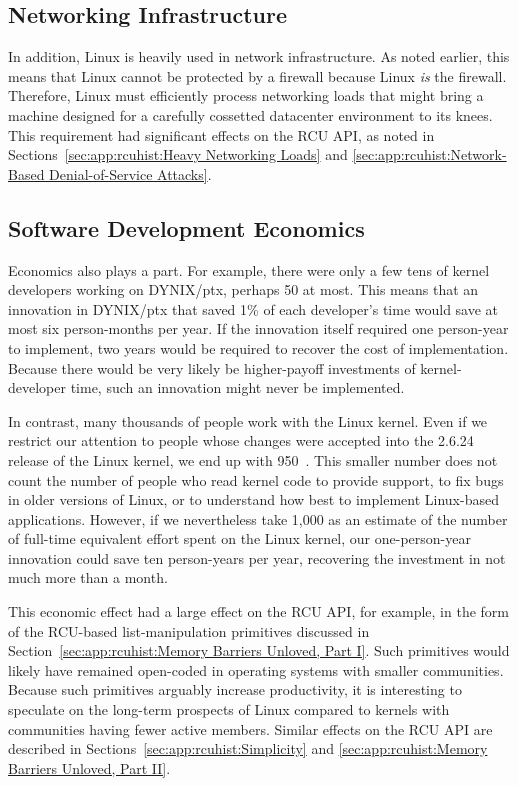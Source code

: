 \subsection{Networking Infrastructure}
\label{sec:app:rcuhist:Networking Infrastructure}

In addition, Linux is heavily used in network infrastructure.
As noted earlier, this means that Linux cannot be protected
by a firewall because Linux \emph{is} the firewall.
Therefore, Linux must efficiently process networking loads that
might bring a machine designed for a carefully cossetted
datacenter environment to its knees.
This requirement had significant effects on the RCU API, as
noted in Sections~\ref{sec:app:rcuhist:Heavy Networking Loads} and
\ref{sec:app:rcuhist:Network-Based Denial-of-Service Attacks}.

\subsection{Software Development Economics}
\label{sec:app:rcuhist:Software Development Economics}

Economics also plays a part.
For example, there were only a few tens of kernel developers working
on DYNIX/ptx, perhaps 50 at most.
This means that an innovation in DYNIX/ptx that saved 1\% of each
developer's time would save at most six person-months per year.
If the innovation itself required one person-year to implement,
two years would be required to recover the cost of implementation.
Because there would be very likely be higher-payoff investments
of kernel-developer time, such an innovation might never be
implemented.

In contrast, many thousands of people work with the Linux kernel.
Even if we restrict our attention to people whose changes were
accepted into the 2.6.24 release of the Linux kernel, we end up
with 950~\cite{Corbet2008stats2:6:24}.
This smaller number does not count the number of people who read
kernel code to provide support, to fix bugs in older versions of
Linux, or to understand how best to implement Linux-based applications.
However, if we nevertheless take 1,000 as an estimate of the
number of full-time equivalent effort spent on the Linux kernel,
our one-person-year innovation could save ten person-years per
year, recovering the investment in not much more than a month.

This economic effect had a large effect on the
RCU API, for example, in the form of the RCU-based list-manipulation
primitives discussed in
Section~\ref{sec:app:rcuhist:Memory Barriers Unloved, Part I}.
Such primitives would likely have remained open-coded in operating
systems with smaller communities.
Because such primitives arguably increase productivity, it is
interesting to speculate on the long-term prospects of Linux
compared to kernels with communities having fewer active members.
Similar effects on the RCU API are described in
Sections~\ref{sec:app:rcuhist:Simplicity} and \ref{sec:app:rcuhist:Memory Barriers Unloved, Part II}.

